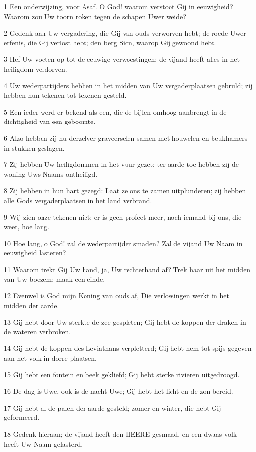 \par 1 Een onderwijzing, voor Asaf. O God! waarom verstoot Gij in eeuwigheid? Waarom zou Uw toorn roken tegen de schapen Uwer weide?
\par 2 Gedenk aan Uw vergadering, die Gij van ouds verworven hebt; de roede Uwer erfenis, die Gij verlost hebt; den berg Sion, waarop Gij gewoond hebt.
\par 3 Hef Uw voeten op tot de eeuwige verwoestingen; de vijand heeft alles in het heiligdom verdorven.
\par 4 Uw wederpartijders hebben in het midden van Uw vergaderplaatsen gebruld; zij hebben hun tekenen tot tekenen gesteld.
\par 5 Een ieder werd er bekend als een, die de bijlen omhoog aanbrengt in de dichtigheid van een geboomte.
\par 6 Alzo hebben zij nu derzelver graveerselen samen met houwelen en beukhamers in stukken geslagen.
\par 7 Zij hebben Uw heiligdommen in het vuur gezet; ter aarde toe hebben zij de woning Uws Naams ontheiligd.
\par 8 Zij hebben in hun hart gezegd: Laat ze ons te zamen uitplunderen; zij hebben alle Gods vergaderplaatsen in het land verbrand.
\par 9 Wij zien onze tekenen niet; er is geen profeet meer, noch iemand bij ons, die weet, hoe lang.
\par 10 Hoe lang, o God! zal de wederpartijder smaden? Zal de vijand Uw Naam in eeuwigheid lasteren?
\par 11 Waarom trekt Gij Uw hand, ja, Uw rechterhand af? Trek haar uit het midden van Uw boezem; maak een einde.
\par 12 Evenwel is God mijn Koning van ouds af, Die verlossingen werkt in het midden der aarde.
\par 13 Gij hebt door Uw sterkte de zee gespleten; Gij hebt de koppen der draken in de wateren verbroken.
\par 14 Gij hebt de koppen des Leviathans verpletterd; Gij hebt hem tot spijs gegeven aan het volk in dorre plaatsen.
\par 15 Gij hebt een fontein en beek gekliefd; Gij hebt sterke rivieren uitgedroogd.
\par 16 De dag is Uwe, ook is de nacht Uwe; Gij hebt het licht en de zon bereid.
\par 17 Gij hebt al de palen der aarde gesteld; zomer en winter, die hebt Gij geformeerd.
\par 18 Gedenk hieraan; de vijand heeft den HEERE gesmaad, en een dwaas volk heeft Uw Naam gelasterd.
